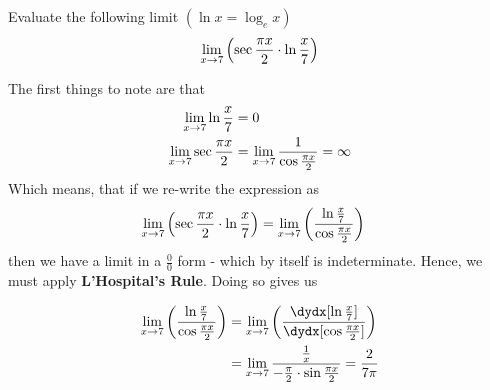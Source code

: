 


\POWER{}\p

\question[4] Evaluate the following limit $(\ln x = \log_{e}x )$ \[ \lim_{x\to7}\left( \sec\frac{\pi x}{2}\cdot\ln\frac{x}{7}\right) \] 

\watchout

\begin{solution}[\halfpage]
  The first things to note are that 
  \begin{align}
    \lim_{x\to7}\ln\frac{x}{7} &= 0 \\
    \lim_{x\to7}\sec\frac{\pi x}{2} &= \lim_{x\to7}\dfrac{1}{\cos\frac{\pi x}{2}} = \infty
  \end{align}
  Which means, that if we re-write the expression as 
  \begin{align}
    \lim_{x\to7}\left( \sec\frac{\pi x}{2}\cdot\ln\frac{x}{7} \right) &= 
    \lim_{x\to7}\left( \dfrac{\ln\frac{x}{7}}{\cos\frac{\pi x}{2}} \right)
  \end{align}
  then we have a limit in a $\frac{0}{0}$ form - which by itself is indeterminate. Hence, we must 
  apply \textbf{L'Hospital's Rule}. Doing so gives us 

  \begin{align}
    \lim_{x\to\va}\left( \dfrac{\ln\frac{x}\va}{\cos\frac{\pi x}{2}} \right) &=
    \lim_{x\to\va}\left( \dfrac{\dydx[\ln\frac{x}\va]}{\dydx[\cos\frac{\pi x}{2}]} \right) \\
    &= \lim_{x\to\va}\dfrac{\frac{1}{x}}{-\frac\pi{2}\cdot\sin\frac{\pi x}{2}} = \vb
  \end{align}
\end{solution}

\ifprintanswers\begin{codex}\end{codex}\fi
